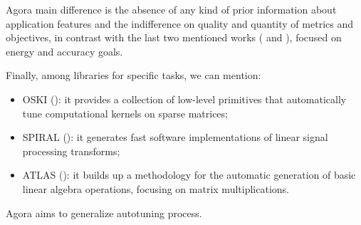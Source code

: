 Agora main difference is the absence of any kind of prior information about application features and the indifference on quality and quantity of metrics and objectives, in contrast with the last two mentioned works (\cite{baek2010green} and \cite{hoffmann2011dynamic}), focused on energy and accuracy goals.

Finally, among libraries for specific tasks, we can mention:

\begin{itemize}

	\item OSKI (\cite{vuduc2005oski}): it provides a collection of low-level primitives that automatically tune computational kernels on sparse matrices;

	\item SPIRAL (\cite{puschel2004spiral}): it generates fast software implementations of linear signal processing transforms;

	\item ATLAS (\cite{whaley1998automatically}): it builds up a methodology for the automatic generation of basic linear algebra operations, focusing on matrix multiplications.

\end{itemize}

Agora aims to generalize autotuning process.
